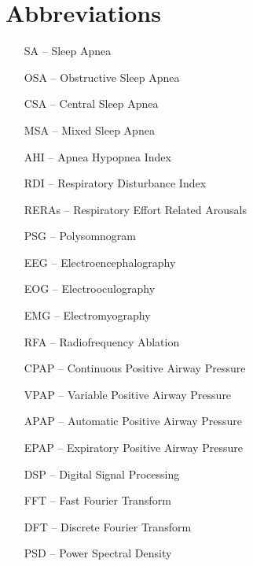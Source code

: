 \section*{Abbreviations}

\begin{itemize}[leftmargin=2cm, topsep=0pt, partopsep=5pt,itemsep=0pt,parsep=0pt]
\item[SA --] Sleep Apnea
\item[OSA --] Obstructive Sleep Apnea
\item[CSA --] Central Sleep Apnea
\item[MSA --] Mixed Sleep Apnea
\item[AHI --] Apnea Hypopnea Index
\item[RDI --] Respiratory Disturbance Index
\item[RERAs --] Respiratory Effort Related Arousals
\item[PSG --] Polysomnogram
\item[EEG --] Electroencephalography
\item[EOG --] Electrooculography
\item[EMG --] Electromyography
\item[RFA --] Radiofrequency Ablation
\item[CPAP --] Continuous Positive Airway Pressure
\item[VPAP --] Variable Positive Airway Pressure
\item[APAP --] Automatic Positive Airway Pressure
\item[EPAP --] Expiratory Positive Airway Pressure
\item[DSP --] Digital Signal Processing
\item[FFT --] Fast Fourier Transform
\item[DFT --] Discrete Fourier Transform
\item[PSD --] Power Spectral Density
\end{itemize}